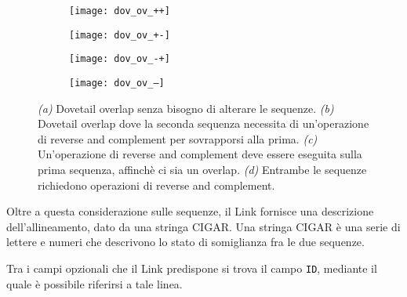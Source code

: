 \captionsetup{justification=centering}
\begin{figure}[h]
	\begin{subfigure}{.5\linewidth}
	  \centering
	  \texttt{[image: dov\_ov\_++]}
	  \caption{}
	  \label{fig:dov-ov++}
	\end{subfigure}%
	\begin{subfigure}{.5\linewidth}
	  \centering
	  \texttt{[image: dov\_ov\_+-]}
	  \caption{}
	  \label{fig:dov-ov+-}
	\end{subfigure}%
	
	\bigskip%
	
	\begin{subfigure}{0.5\linewidth}
	  \centering
	  \texttt{[image: dov\_ov\_-+]}
	  \caption{}
	  \label{fig:dov-ov-+}
	\end{subfigure}%
	\begin{subfigure}{0.5\linewidth}
	  \centering
	  \texttt{[image: dov\_ov\_--]}
	  \caption{}
	  \label{fig:dov-ov--}
	\end{subfigure}
	
	\captionsetup{justification=justified}
	\caption[Rappresentazione delle possibili situazioni di dovetail overlap]{
		\textit{(a)} Dovetail overlap senza bisogno di alterare le sequenze.
		\textit{(b)}  Dovetail overlap dove la seconda sequenza necessita
	  		di un'operazione di reverse and complement per sovrapporsi alla prima.
	  	\textit{(c)} Un'operazione di reverse and complement deve essere eseguita
	  		sulla prima sequenza, affinchè ci sia un overlap.
	  	\textit{(d)} Entrambe le sequenze richiedono operazioni di reverse and complement.}
	\label{fig:dov-ov}
\end{figure}

Oltre a questa considerazione sulle sequenze, il Link fornisce una descrizione
dell'allineamento, dato da una stringa CIGAR. Una stringa CIGAR è
una serie di lettere e numeri che descrivono lo stato di somiglianza
fra le due sequenze.

Tra i campi opzionali che il Link predispone si trova il campo
\texttt{ID}, mediante il quale è possibile riferirsi a tale
linea.



